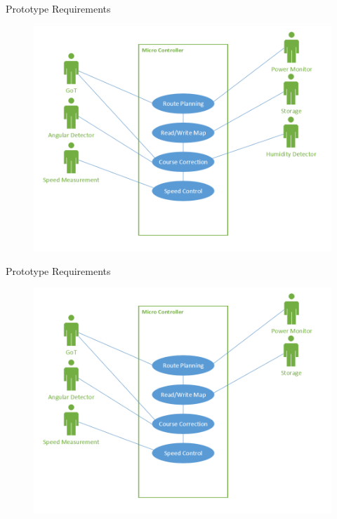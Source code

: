 \begin{frame}{Prototype Requirements}
\begin{figure}
\includegraphics[width=\textwidth]{Pictures/uc5.png}
\end{figure}
\end{frame}
\begin{frame}{Prototype Requirements}
\begin{figure}
\includegraphics[width=\textwidth]{Pictures/uc6.png}
\end{figure}
\end{frame}


